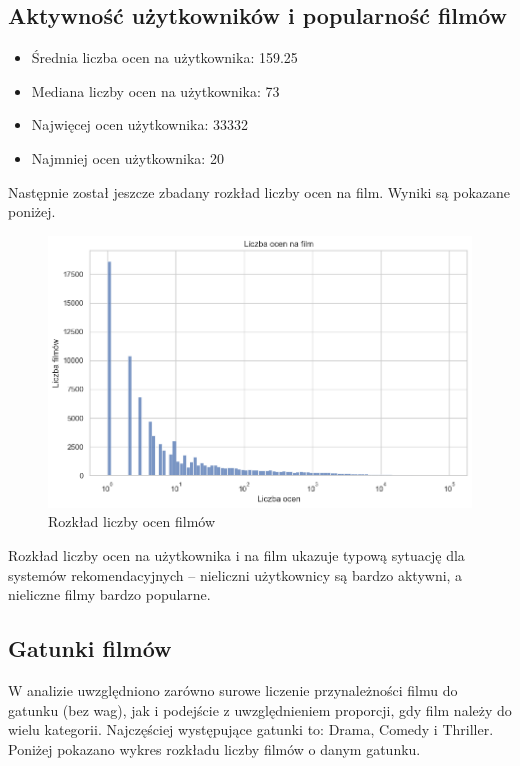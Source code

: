 \documentclass{article}
\begin{document}
\subsection{Aktywność użytkowników i popularność filmów}
\begin{itemize}
    \item Średnia liczba ocen na użytkownika: 159.25
    \item Mediana liczby ocen na użytkownika: 73
    \item Najwięcej ocen użytkownika: 33332
    \item Najmniej ocen użytkownika: 20
\end{itemize}
Następnie został jeszcze zbadany rozkład liczby ocen na film. Wyniki są pokazane poniżej.
\begin{figure}[H]
\centering
\includegraphics[width=1\textwidth]{pictures/locen_per_film.png}
\caption{Rozkład liczby ocen filmów}
\label{fig:oceny_per_film_rozklad}
\end{figure}
Rozkład liczby ocen na użytkownika i na film ukazuje typową sytuację dla systemów rekomendacyjnych – nieliczni użytkownicy są bardzo aktywni, a nieliczne filmy bardzo popularne.

\subsection{Gatunki filmów}
W analizie uwzględniono zarówno surowe liczenie przynależności filmu do gatunku (bez wag), jak i podejście z uwzględnieniem proporcji, gdy film należy do wielu kategorii. Najczęściej występujące gatunki to: Drama, Comedy i Thriller. Poniżej pokazano wykres rozkładu liczby filmów o danym gatunku.
\end{document}
